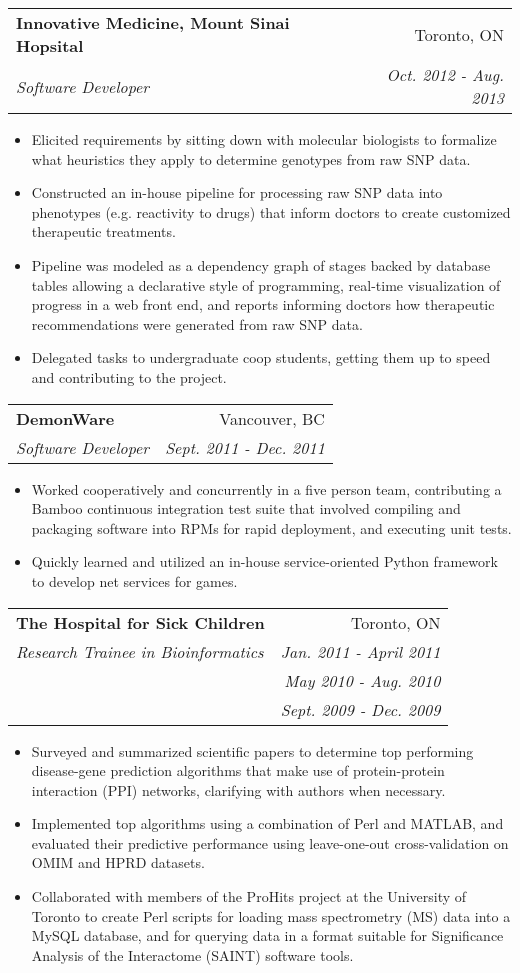 \documentclass[letterpaper,11pt]{article}
\makeatletter
\newcommand{\BulletZeroLeftMargin}{1.5em}
\newcommand{\company}[1]{%
    \textbf{#1}
}
\newcommand{\resitem}[1]{\item #1 \vspace{-2pt}}
\newcommand{\ressubheading}[4]{
\begin{tabular*}{6.5in}{l@{\extracolsep{\fill}}r}
    
		\company{#1} & #2 \\
		\textit{#3} & \textit{#4} \\
\end{tabular*}\vspace{-6pt}}
\newcommand{\sickkids}[6]{
\begin{tabular*}{6.5in}{l@{\extracolsep{\fill}}r}
		\company{#1} & #2 \\
		\textit{#3} & \textit{#4} \\
		 & \textit{#5} \\
		 & \textit{#6} \\
\end{tabular*}\vspace{-6pt}}
\makeatother
\begin{document}
\begin{itemize}[leftmargin=\BulletZeroLeftMargin]
	\ressubheading{Innovative Medicine, Mount Sinai Hopsital}{Toronto, ON}{Software Developer}{Oct. 2012 - Aug. 2013}
    \begin{itemize}[leftmargin=\BulletZeroLeftMargin]
		\resitem{
            Elicited requirements by sitting down with molecular biologists to formalize 
            what heuristics they apply to determine genotypes from raw SNP data.
        }
		\resitem{
            Constructed an in-house pipeline for processing raw SNP data into phenotypes 
            (e.g. reactivity to drugs) that inform doctors to create customized therapeutic 
            treatments.  
        }
        \resitem{
            Pipeline was modeled as a dependency graph of stages backed by database 
            tables allowing a declarative style of programming, real-time 
            visualization of progress in a web front end, and reports informing 
            doctors how therapeutic recommendations were generated from raw SNP data.
        }
        \resitem{
            Delegated tasks to undergraduate coop students, getting them up to speed and 
            contributing to the project.
        }
	\end{itemize}

	\ressubheading{DemonWare}{Vancouver, BC}{Software Developer}{Sept. 2011 - Dec. 2011}
    \begin{itemize}[leftmargin=\BulletZeroLeftMargin]
		\resitem{
            Worked cooperatively and concurrently in a five person team, contributing a 
            Bamboo continuous integration test suite that involved compiling and packaging 
            software into RPMs for rapid deployment, and executing unit tests.
        }
        \resitem{
            Quickly learned and utilized an in-house service-oriented Python framework to 
            develop net services for games.
        }
	\end{itemize}

	\sickkids{The Hospital for Sick Children}{Toronto, ON}{Research Trainee in 
    Bioinformatics}{Jan. 2011 - April 2011}{May 2010 - Aug. 2010}{Sept. 2009 - Dec. 2009}
    \begin{itemize}[leftmargin=\BulletZeroLeftMargin]
		\resitem{
             Surveyed and summarized scientific papers to determine top performing 
             disease-gene prediction algorithms that make use of protein-protein interaction 
             (PPI) networks, clarifying with authors when necessary.
        }
        \resitem{
             Implemented top algorithms using a combination of Perl and MATLAB, and 
             evaluated their predictive performance using leave-one-out cross-validation on 
             OMIM and HPRD datasets.
        }
        \resitem{
             Collaborated with members of the ProHits project at the University of Toronto 
             to create Perl scripts for loading mass spectrometry (MS) data into a MySQL 
             database, and for querying data in a format suitable for Significance Analysis 
             of the Interactome (SAINT) software tools.
        }
	\end{itemize}

\end{itemize}
\end{document}
